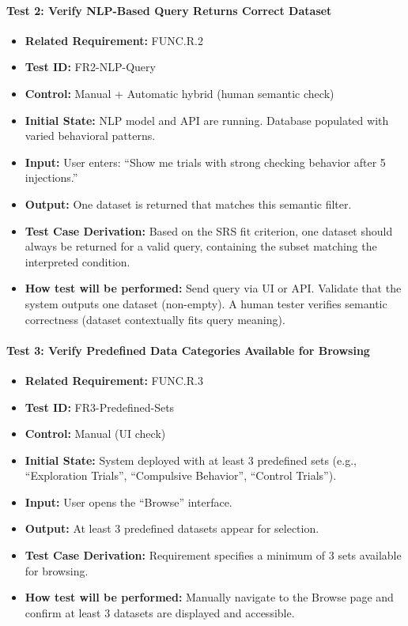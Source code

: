 \documentclass[12pt, titlepage]{article}
\begin{document}
\paragraph{Test 2: Verify NLP-Based Query Returns Correct Dataset}
\begin{itemize}
    \item \textbf{Related Requirement:} FUNC.R.2
    \item \textbf{Test ID:} FR2-NLP-Query
    \item \textbf{Control:} Manual + Automatic hybrid (human semantic check)
    \item \textbf{Initial State:} NLP model and API are running. Database populated with varied behavioral patterns.
    \item \textbf{Input:} User enters: ``Show me trials with strong checking behavior after 5 injections.''
    \item \textbf{Output:} One dataset is returned that matches this semantic filter.
    \item \textbf{Test Case Derivation:} Based on the SRS fit criterion, one dataset should always be returned for a valid query, containing the subset matching the interpreted condition.
    \item \textbf{How test will be performed:} Send query via UI or API. Validate that the system outputs one dataset (non-empty). A human tester verifies semantic correctness (dataset contextually fits query meaning).
\end{itemize}

\paragraph{Test 3: Verify Predefined Data Categories Available for Browsing}
\begin{itemize}
    \item \textbf{Related Requirement:} FUNC.R.3
    \item \textbf{Test ID:} FR3-Predefined-Sets
    \item \textbf{Control:} Manual (UI check)
    \item \textbf{Initial State:} System deployed with at least 3 predefined sets (e.g., ``Exploration Trials'', ``Compulsive Behavior'', ``Control Trials'').
    \item \textbf{Input:} User opens the ``Browse'' interface.
    \item \textbf{Output:} At least 3 predefined datasets appear for selection.
    \item \textbf{Test Case Derivation:} Requirement specifies a minimum of 3 sets available for browsing.
    \item \textbf{How test will be performed:} Manually navigate to the Browse page and confirm at least 3 datasets are displayed and accessible.
\end{itemize}
\end{document}

